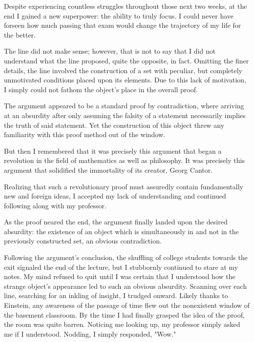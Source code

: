 \documentclass[12pt]{article}
\begin{document}
  Despite experiencing countless struggles throughout those next two weeks, at the end I gained a new superpower: the ability to truly focus. I could never have forseen how much passing that exam would change the trajectory of my life for the better.


The line did not make sense; however, that is not to say that I did not understand what the line proposed, quite the opposite, in fact. Omitting the finer details, the line involved the construction of a set with peculiar, but completely unmotivated conditions placed upon its elements. Due to this lack of motivation, I simply could not fathom the object's place in the overall proof. %

The argument appeared to be a standard proof by contradiction, where arriving at an absurdity after only assuming the falsity of a statement necessarily implies the truth of said statement. Yet the construction of this object threw any familiarity with this proof method out of the window.

But then I remembered that it was precisely this argument that began a revolution in the field of mathematics as well as philosophy. It was precisely this argument that solidified the immortality of its creator, Georg Cantor.

Realizing that such a revolutionary proof must assuredly contain fundamentally new and foreign ideas, I accepted my lack of understanding and continued following along with my professor.

As the proof neared the end, the argument finally landed upon the desired absurdity: the existence of an object which is simultaneously in and not in the previously constructed set, an obvious contradiction.

Following the argument's conclusion, the shuffling of college students towards the exit signaled the end of the lecture, but I stubbornly continued to stare at my notes. My mind refused to quit until I was certain that I understood how the strange object's appearance led to such an obvious absurdity. Scanning over each line, searching for an inkling of insight, I trudged onward. Likely thanks to Einstein, any awareness of the passage of time flew out the nonexistent window of the basement classroom. By the time I had finally grasped the idea of the proof, the room was quite barren. Noticing me looking up, my professor simply asked me if I understood. Nodding, I simply responded, "Wow."
\end{document}
